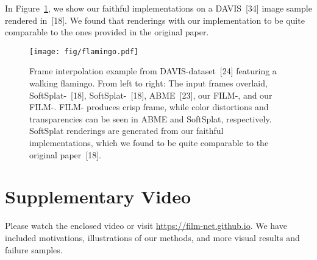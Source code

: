 \documentclass[runningheads]{llncs}
\begin{document}
In Figure~\ref{fig:flamingo}, we show our faithful implementations on a DAVIS~[34] image sample rendered in~[18]. We found that renderings with our implementation to be quite comparable to the ones provided in the original paper. 

\begin{figure}[t!]
\centering
    \texttt{[image: fig/flamingo.pdf]}
    \vspace{-4ex}
    \caption{
    Frame interpolation example from DAVIS-dataset~[24] featuring a walking flamingo. From left to right: The input frames overlaid, SoftSplat-~[18], SoftSplat-~[18], ABME~[23], our FILM-, and our FILM-. FILM- produces crisp frame, while color distortions and transparencies can be seen in ABME and SoftSplat, respectively. SoftSplat renderings are generated from our faithful implementations, which we found to be quite comparable to the original paper~[18].}
    \label{fig:flamingo}
\end{figure}


\section{Supplementary Video}
Please watch the enclosed video or visit \url{https://film-net.github.io}. We have included motivations, illustrations of our methods, and more visual results and failure samples.






     





 
\end{document}
